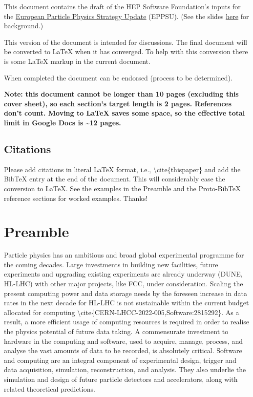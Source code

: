This document contains the draft of the HEP Software Foundation's inputs
for the \href{https://europeanstrategy.cern}{\ul{European Particle
Physics Strategy Update}} (EPPSU). (See the slides
\href{https://indico.cern.ch/event/1355758/}{\ul{here}} for background.)

This version of the document is intended for discussions. The final
document will be converted to LaTeX when it has converged. To help with
this conversion there is some LaTeX markup in the current document.

When completed the document can be endorsed (process to be determined).

\textbf{Note: this document cannot be longer than 10 pages (excluding
this cover sheet), so each section's target length is 2 pages.
References don't count. Moving to LaTeX saves some space, so the
effective total limit in Google Docs is \textasciitilde12 pages.}

\subsection{Citations}\label{citations}

Please add citations in literal LaTeX format, i.e.,
\textbackslash cite\{thispaper\} and add the BibTeX entry at the end of
the document. This will considerably ease the conversion to LaTeX. See
the examples in the Preamble and the Proto-BibTeX reference sections for
worked examples. Thanks!

\section{Preamble}\label{preamble}

Particle physics has an ambitious and broad global experimental
programme for the coming decades. Large investments in building new
facilities, future experiments and upgrading existing experiments are
already underway (DUNE, HL-LHC) with other major projects, like FCC,
under consideration. Scaling the present computing power and data
storage needs by the foreseen increase in data rates in the next decade
for HL-LHC is not sustainable within the current budget allocated for
computing \textbackslash cite\{CERN-LHCC-2022-005,Software:2815292\}. As
a result, a more efficient usage of computing resources is required in
order to realise the physics potential of future data taking. A
commensurate investment to hardware in the computing and software, used
to acquire, manage, process, and analyse the vast amounts of data to be
recorded, is absolutely critical. Software and computing are an integral
component of experimental design, trigger and data acquisition,
simulation, reconstruction, and analysis. They also underlie the
simulation and design of future particle detectors and accelerators,
along with related theoretical predictions.

